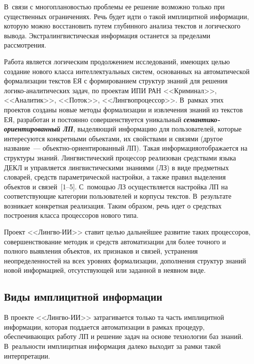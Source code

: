 \begin{multicols}{2}
В~связи с многоплановостью проблемы ее решение 
возможно только при существенных ограничениях. Речь будет идти о такой 
имплицитной информации, которую можно восстановить путем глубинного 
анализа текстов и логического вывода. Экстралингвистическая информация 
останется за пределами рассмотрения. 
     
     Работа является логическим продолжением исследований, имеющих 
целью создание нового \mbox{класса} интеллектуальных сис\-тем, основанных на 
автоматической формализации текстов ЕЯ с формированием структур знаний 
для решения ло\-ги\-ко-ана\-ли\-ти\-че\-ских задач, по проектам ИПИ РАН 
<<Криминал>>, <<Аналитик>>, <<Поток>>, <<Лингвопроцессор>>. В~рамках 
этих проектов созданы новые методы формализации и извлечения знаний из 
текстов ЕЯ, разработан и постоянно совершенствуется уникальный 
{\bfseries\textit{семантико-ориентированный ЛП}}, 
выделяющий информацию для пользователей, которые интересуются 
конкретными объектами, их свойствами и связями (другое название~--- 
объект\-но-ори\-ен\-ти\-ро\-ван\-ный ЛП). Такая информация\linebreak отоб\-ра\-жа\-ет\-ся на 
структуры знаний. Лингвисти\-ческий процессор реализован средствами языка ДЕКЛ и 
управляется лингвистическими знаниями (ЛЗ) в виде предметных словарей, 
средств параметрической настройки, а также правил выделения объектов и 
связей~[1--5]. С~помощью ЛЗ осуществляется настройка ЛП на 
соответствующие категории пользователей и корпусы текстов. В~результате 
возникает конкретная реализация. Таким образом, речь идет о средствах 
построения класса процессоров нового типа. 
     
     Проект <<Лингво-ИИ>> ставит целью дальнейшее развитие таких 
процессоров, совершенствование методик и средств автоматизации для более 
точного и полного выявления объектов, их признаков и связей, устранения 
неопределенностей на всех уровнях формализации, дополнения структур 
знаний новой информацией, отсутствующей или заданной в неявном виде. 
 
\subsection{Виды имплицитной информации}
     
     В проекте <<Лингво-ИИ>> затрагивается только та часть имплицитной 
информации, которая поддается автоматизации в рамках процедур, 
обеспечивающих работу ЛП и решение задач на 
основе технологии баз знаний. В~реальности имплицитная информация далеко 
выходит за рамки такой интерпретации. 
     

\end{multicols}
